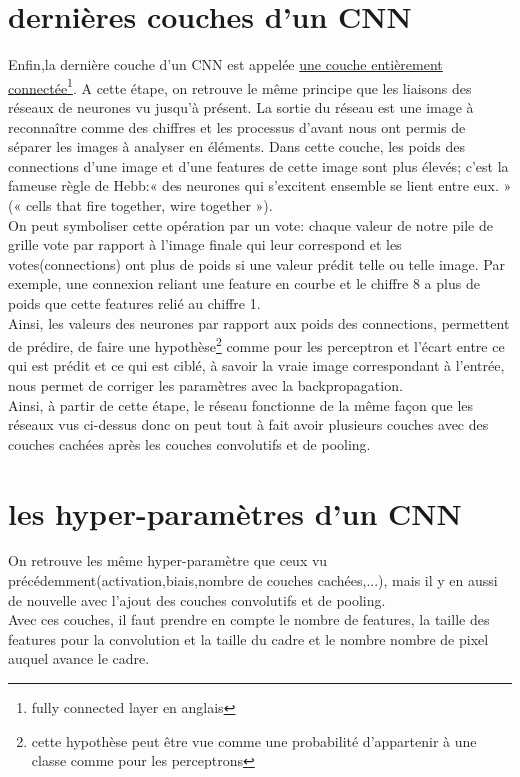 \documentclass[openany,14pt,fleqn]{book} %
\begin{document}
\section{dernières couches d'un CNN}
Enfin,la dernière couche d'un CNN est appelée \underline{une couche entièrement connectée}\footnote{
fully connected layer en anglais}. A cette étape, on retrouve le même principe que les liaisons des réseaux de neurones vu jusqu'à présent. La sortie du réseau est une image à reconnaître comme des chiffres et les processus d'avant nous ont permis de séparer les images à analyser en éléments. Dans cette couche, les poids des connections d'une image et d'une features de cette image sont plus élevés; c'est la fameuse règle de Hebb:« des neurones qui s'excitent ensemble se lient entre eux. » (« cells that fire together, wire together »).\\
On peut symboliser cette opération par un vote: chaque valeur de notre pile de grille vote par rapport à l'image finale qui leur correspond et les votes(connections) ont plus de poids si une valeur prédit telle ou telle image. Par exemple, une connexion reliant une feature en courbe et le chiffre 8 a plus de poids que cette features relié au chiffre 1.\\
Ainsi, les valeurs des neurones par rapport aux poids des connections, permettent de prédire, de faire une hypothèse\footnote{cette hypothèse peut être vue comme une probabilité d'appartenir à une classe comme pour les perceptrons} comme pour les perceptron et l'écart entre ce qui est prédit et ce qui est ciblé, à savoir la vraie image correspondant à l'entrée, nous permet de corriger les paramètres avec la backpropagation.\\
Ainsi, à partir de cette étape, le réseau fonctionne de la même façon que les réseaux vus ci-dessus donc on peut tout à fait avoir plusieurs couches avec des couches cachées après les couches convolutifs et de pooling.\\
\section{les hyper-paramètres d'un CNN}
On retrouve les même hyper-paramètre que ceux vu précédemment(activation,biais,nombre de couches cachées,...), mais il y en aussi de nouvelle avec l'ajout des couches convolutifs et de pooling.\\
Avec ces couches, il faut prendre en compte le nombre de features, la taille des features pour la convolution et la taille du cadre et le nombre nombre de pixel auquel avance le cadre.
\end{document}
